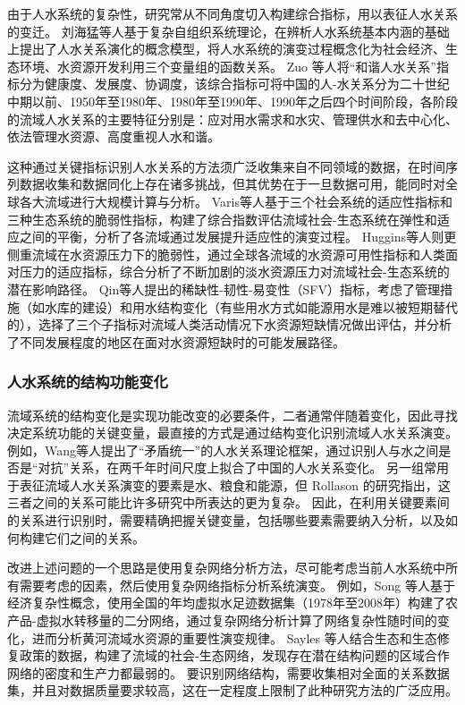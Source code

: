 由于人水系统的复杂性，研究常从不同角度切入构建综合指标，用以表征人水关系的变迁。
刘海猛等人基于复杂自组织系统理论，在辨析人水系统基本内涵的基础上提出了人水关系演化的概念模型，将人水系统的演变过程概念化为社会经济、生态环境、水资源开发利用三个变量组的函数关系\cite{liu2014}。
Zuo 等人将“和谐人水关系”指标分为健康度、发展度、协调度\cite{zuo2008}，该综合指标可将中国的人-水关系分为二十世纪中期以前、1950年至1980年、1980年至1990年、1990年之后四个时间阶段，各阶段的流域人水关系的主要特征分别是：应对用水需求和水灾、管理供水和去中心化、依法管理水资源、高度重视人水和谐\cite{zuo2016a}。

这种通过关键指标识别人水关系的方法须广泛收集来自不同领域的数据，在时间序列数据收集和数据同化上存在诸多挑战，但其优势在于一旦数据可用，能同时对全球各大流域进行大规模计算与分析。
Varis等人基于三个社会系统的适应性指标和三种生态系统的脆弱性指标，构建了综合指数评估流域社会-生态系统在弹性和适应之间的平衡，分析了各流域通过发展提升适应性的演变过程\cite{varis2019}。
Huggins等人则更侧重流域在水资源压力下的脆弱性，通过全球各流域的水资源可用性指标和人类面对压力的适应指标，综合分析了不断加剧的淡水资源压力对流域社会-生态系统的潜在影响路径\cite{huggins2022}。
Qin等人提出的稀缺性-韧性-易变性（SFV）指标，考虑了管理措施（如水库的建设）和用水结构变化（有些用水方式如能源用水是难以被短期替代的），选择了三个子指标对流域人类活动情况下水资源短缺情况做出评估，并分析了不同发展程度的地区在面对水资源短缺时的可能发展路径\cite{qin2019}。

\subsubsection*{人水系统的结构功能变化}

流域系统的结构变化是实现功能改变的必要条件，二者通常伴随着变化，因此寻找决定系统功能的关键变量，最直接的方式是通过结构变化识别流域人水关系演变。
例如，Wang等人提出了“矛盾统一”的人水关系理论框架，通过识别人与水之间是否是“对抗”关系，在两千年时间尺度上拟合了中国的人水关系变化\cite{wang2017}。
另一组常用于表征流域人水关系演变的要素是水、粮食和能源，但 Rollason 的研究指出，这三者之间的关系可能比许多研究中所表达的更为复杂\cite{rollason2021}。
因此，在利用关键要素间的关系进行识别时，需要精确把握关键变量，包括哪些要素需要纳入分析，以及如何构建它们之间的关系\cite{zhangzongyong2020, wang2021}。

改进上述问题的一个思路是使用复杂网络分析方法，尽可能考虑当前人水系统中所有需要考虑的因素，然后使用复杂网络指标分析系统演变\cite{sayles2019, bodin2017b}。
例如，Song 等人基于经济复杂性概念，使用全国的年均虚拟水足迹数据集（1978年至2008年）构建了农产品-虚拟水转移量的二分网络，通过复杂网络分析计算了网络复杂性随时间的变化，进而分析黄河流域水资源的重要性演变规律\cite{song2022}。
Sayles 等人结合生态和生态修复政策的数据，构建了流域的社会-生态网络，发现存在潜在结构问题的区域合作网络的密度和生产力都最弱的\cite{sayles2017}。
要识别网络结构，需要收集相对全面的关系数据集，并且对数据质量要求较高，这在一定程度上限制了此种研究方法的广泛应用。

